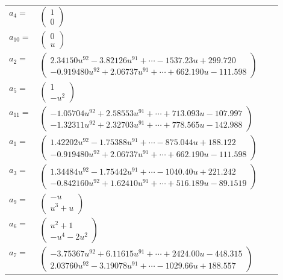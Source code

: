 \documentclass[1p]{elsarticle_modified}
\theoremstyle{definition}
\begin{document}
\begin{tabular}{m{7pt} m{180pt} m{7pt} m{180pt} }
\flushright $a_{4}=$&$\begin{pmatrix}1\\0\end{pmatrix}$ \\
\flushright $a_{10}=$&$\begin{pmatrix}0\\u\end{pmatrix}$ \\
\flushright $a_{2}=$&$\begin{pmatrix}2.34150 u^{92}-3.82126 u^{91}+\cdots-1537.23 u+299.720\\-0.919480 u^{92}+2.06737 u^{91}+\cdots+662.190 u-111.598\end{pmatrix}$ \\
\flushright $a_{5}=$&$\begin{pmatrix}1\\- u^2\end{pmatrix}$ \\
\flushright $a_{11}=$&$\begin{pmatrix}-1.05704 u^{92}+2.58553 u^{91}+\cdots+713.093 u-107.997\\-1.32311 u^{92}+2.32703 u^{91}+\cdots+778.565 u-142.988\end{pmatrix}$ \\
\flushright $a_{1}=$&$\begin{pmatrix}1.42202 u^{92}-1.75388 u^{91}+\cdots-875.044 u+188.122\\-0.919480 u^{92}+2.06737 u^{91}+\cdots+662.190 u-111.598\end{pmatrix}$ \\
\flushright $a_{3}=$&$\begin{pmatrix}1.34484 u^{92}-1.75442 u^{91}+\cdots-1040.40 u+221.242\\-0.842160 u^{92}+1.62410 u^{91}+\cdots+516.189 u-89.1519\end{pmatrix}$ \\
\flushright $a_{9}=$&$\begin{pmatrix}- u\\u^3+u\end{pmatrix}$ \\
\flushright $a_{6}=$&$\begin{pmatrix}u^2+1\\- u^4-2 u^2\end{pmatrix}$ \\
\flushright $a_{7}=$&$\begin{pmatrix}-3.75367 u^{92}+6.11615 u^{91}+\cdots+2424.00 u-448.315\\2.03760 u^{92}-3.19078 u^{91}+\cdots-1029.66 u+188.557\end{pmatrix}$ \\

\end{tabular}
\end{document}

